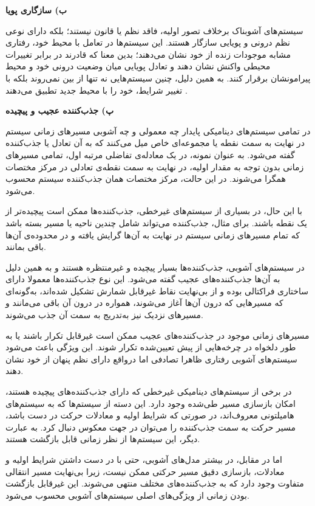 \textbf{ب) سازگاری پویا}

سیستم‌های آشوبناک برخلاف تصور اولیه، فاقد نظم یا قانون نیستند؛ بلکه دارای نوعی نظم درونی و پویایی سازگار هستند. این سیستم‌ها در تعامل با محیط خود، رفتاری مشابه موجودات زنده از خود نشان می‌دهند؛ بدین معنا که قادرند در برابر تغییرات محیطی واکنش نشان دهند و تعادل پویایی میان وضعیت درونی خود و محیط پیرامونشان برقرار کنند. به همین دلیل، چنین سیستم‌هایی نه تنها از بین نمی‌روند بلکه با تغییر شرایط، خود را با محیط جدید تطبیق می‌دهند \cite{ref41}.

\textbf{پ) جذب‌کننده عجیب و پیچیده}

در تمامی سیستم‌های دینامیکی پایدار \lr{---} چه معمولی و چه آشوبی \lr{---} مسیرهای زمانی سیستم در نهایت به سمت نقطه یا مجموعه‌ای خاص میل می‌کنند که به آن تعادل یا جذب‌کننده گفته می‌شود. به عنوان نمونه، در یک معادله‌ی تفاضلی مرتبه اول، تمامی مسیرهای زمانی بدون توجه به مقدار اولیه، در نهایت به سمت نقطه‌ی تعادلی در مرکز مختصات همگرا می‌شوند. در این حالت، مرکز مختصات همان جذب‌کننده سیستم محسوب می‌شود.

با این حال، در بسیاری از سیستم‌های غیرخطی، جذب‌کننده‌ها ممکن است پیچیده‌تر از یک نقطه باشند. برای مثال، جذب‌کننده می‌تواند شامل چندین ناحیه یا مسیر بسته باشد که تمام مسیرهای زمانی سیستم در نهایت به آن‌ها گرایش یافته و در محدوده‌ی آن‌ها باقی بمانند.

در سیستم‌های آشوبی، جذب‌کننده‌ها بسیار پیچیده و غیرمنتظره هستند و به همین دلیل به آن‌ها جذب‌کننده‌های عجیب گفته می‌شود. این نوع جذب‌کننده‌ها معمولا دارای ساختاری فراکتالی بوده و از بی‌نهایت نقاط غیرقابل شمارش تشکیل شده‌اند، به‌گونه‌ای که مسیرهایی که درون آن‌ها آغاز می‌شوند، همواره در درون آن باقی می‌مانند و مسیرهای نزدیک نیز به‌تدریج به سمت آن جذب می‌شوند\cite{ref46}.

مسیرهای زمانی موجود در جذب‌کننده‌های عجیب ممکن است غیرقابل تکرار باشند یا به طور دلخواه در چرخه‌هایی از پیش تعیین‌شده تکرار شوند. این ویژگی باعث می‌شود سیستم‌های آشوبی رفتاری ظاهرا تصادفی اما درواقع دارای نظم پنهان از خود نشان دهند.

در برخی از سیستم‌های دینامیکی غیرخطی که دارای جذب‌کننده‌های پیچیده هستند، امکان بازسازی مسیر طی‌شده وجود دارد. این دسته از سیستم‌ها که به سیستم‌های هامیلتونی  معروف‌اند، در صورتی که شرایط اولیه و معادلات حرکت در دست باشد، مسیر حرکت به سمت جذب‌کننده را می‌توان در جهت معکوس دنبال کرد. به عبارت دیگر، این سیستم‌ها از نظر زمانی قابل بازگشت هستند.

اما در مقابل، در بیشتر مدل‌های آشوبی، حتی با در دست داشتن شرایط اولیه و معادلات، بازسازی دقیق مسیر حرکتی ممکن نیست، زیرا بی‌نهایت مسیر انتقالی متفاوت وجود دارد که به جذب‌کننده‌های مختلف منتهی می‌شوند. این غیرقابل بازگشت بودن زمانی از ویژگی‌های اصلی سیستم‌های آشوبی محسوب می‌شود.

